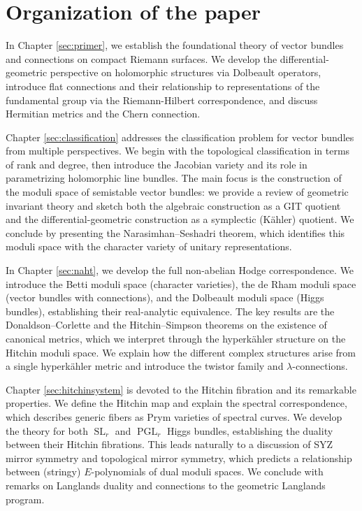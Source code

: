 \documentclass[12pt,a4paper]{amsbook}
\theoremstyle{remark} \newtheorem{rmk}[thm]{Remark}
\theoremstyle{definition} \newtheorem{defn}[thm]{Definition}
\theoremstyle{definition} \newtheorem{ex}[thm]{Example}
\theoremstyle{definition} \newtheorem{ej}{Exercise}
\DeclareMathOperator{\SL}{SL}
\DeclareMathOperator{\PGL}{PGL}
\begin{document}
\section{Organization of the paper}
In Chapter \ref{sec:primer}, we establish the foundational theory of vector bundles and connections on compact Riemann surfaces. We develop the differential-geometric perspective on holomorphic structures via Dolbeault operators, introduce flat connections and their relationship to representations of the fundamental group via the Riemann-Hilbert correspondence, and discuss Hermitian metrics and the Chern connection.

Chapter \ref{sec:classification} addresses the classification problem for vector bundles from multiple perspectives. We begin with the topological classification in terms of rank and degree, then introduce the Jacobian variety and its role in parametrizing holomorphic line bundles. The main focus is the construction of the moduli space of semistable vector bundles: we provide a review of geometric invariant theory and sketch both the algebraic construction as a GIT quotient and the differential-geometric construction as a symplectic (Kähler) quotient. We conclude by presenting the Narasimhan--Seshadri theorem, which identifies this moduli space with the character variety of unitary representations.

In Chapter \ref{sec:naht}, we develop the full non-abelian Hodge correspondence. We introduce the Betti moduli space (character varieties), the de Rham moduli space (vector bundles with connections), and the Dolbeault moduli space (Higgs bundles), establishing their real-analytic equivalence. The key results are the Donaldson--Corlette and the Hitchin--Simpson theorems on the existence of canonical metrics, which we interpret through the hyperkähler structure on the Hitchin moduli space. We explain how the different complex structures arise from a single hyperkähler metric and introduce the twistor family and $\lambda$-connections.

Chapter \ref{sec:hitchinsystem} is devoted to the Hitchin fibration and its remarkable properties. We define the Hitchin map and explain the spectral correspondence, which describes generic fibers as Prym varieties of spectral curves. We develop the theory for both $\SL_r$ and $\PGL_r$ Higgs bundles, establishing the duality between their Hitchin fibrations. This leads naturally to a discussion of SYZ mirror symmetry and topological mirror symmetry, which predicts a relationship between (stringy) $E$-polynomials of dual moduli spaces. We conclude with remarks on Langlands duality and connections to the geometric Langlands program.
\end{document}
